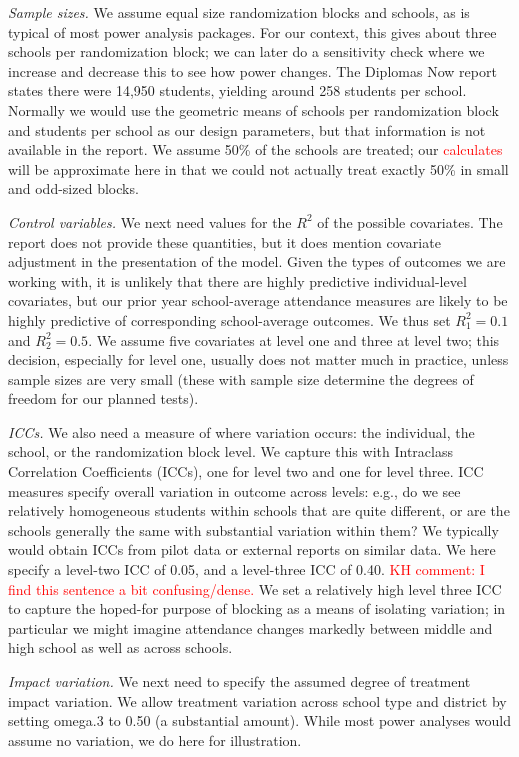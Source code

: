 \documentclass[
]{article}
\begin{document}
\emph{Sample sizes.} We assume equal size randomization blocks and
schools, as is typical of most power analysis packages. For our context,
this gives about three schools per randomization block; we can later do
a sensitivity check where we increase and decrease this to see how power
changes. The Diplomas Now report states there were 14,950 students,
yielding around 258 students per school. Normally we would use the
geometric means of schools per randomization block and students per
school as our design parameters, but that information is not available
in the report. We assume 50\% of the schools are treated; our
\textcolor{red}{calculates} will be approximate here in that we could
not actually treat exactly 50\% in small and odd-sized blocks.

\emph{Control variables.} We next need values for the \(R^2\) of the
possible covariates. The report does not provide these quantities, but
it does mention covariate adjustment in the presentation of the model.
Given the types of outcomes we are working with, it is unlikely that
there are highly predictive individual-level covariates, but our prior
year school-average attendance measures are likely to be highly
predictive of corresponding school-average outcomes. We thus set
\(R^2_1 = 0.1\) and \(R^2_2 = 0.5\). We assume five covariates at level
one and three at level two; this decision, especially for level one,
usually does not matter much in practice, unless sample sizes are very
small (these with sample size determine the degrees of freedom for our
planned tests).

\emph{ICCs.} We also need a measure of where variation occurs: the
individual, the school, or the randomization block level. We capture
this with Intraclass Correlation Coefficients (ICCs), one for level two
and one for level three. ICC measures specify overall variation in
outcome across levels: e.g., do we see relatively homogeneous students
within schools that are quite different, or are the schools generally
the same with substantial variation within them? We typically would
obtain ICCs from pilot data or external reports on similar data. We here
specify a level-two ICC of 0.05, and a level-three ICC of 0.40.
\textcolor{red}{KH comment: I find this sentence a bit confusing/dense.}
We set a relatively high level three ICC to capture the hoped-for
purpose of blocking as a means of isolating variation; in particular we
might imagine attendance changes markedly between middle and high school
as well as across schools.

\emph{Impact variation.} We next need to specify the assumed degree of
treatment impact variation. We allow treatment variation across school
type and district by setting omega.3 to 0.50 (a substantial amount).
While most power analyses would assume no variation, we do here for
illustration.
\end{document}
